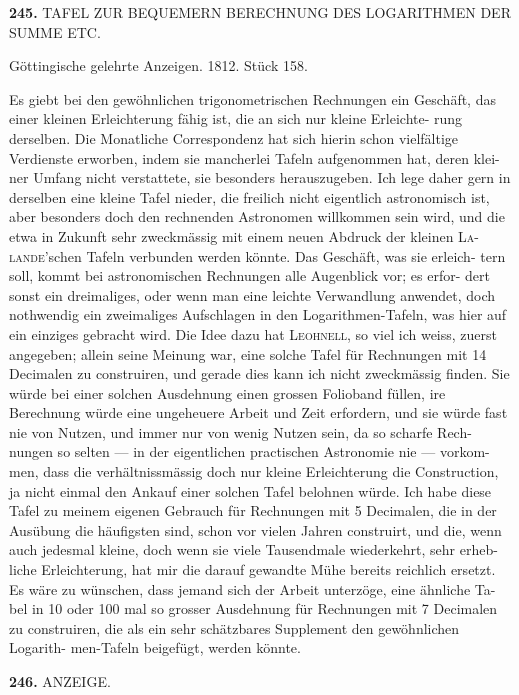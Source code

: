 \documentclass[12pt,a4paper]{article}
\begin{document}
\newpage
\noindent\textbf{245.}\quad
TAFEL ZUR BEQUEMERN BERECHNUNG DES LOGARITHMEN DER SUMME ETC.

\smallskip\noindent
Göttingische gelehrte Anzeigen. 1812. Stück 158.

\smallskip\noindent
Es giebt bei den gewöhnlichen trigonometrischen Rechnungen ein Geschäft,
das einer kleinen Erleichterung fähig ist, die an sich nur kleine Erleichte-
rung derselben. Die Monatliche Correspondenz hat sich hierin schon vielfältige
Verdienste erworben, indem sie mancherlei Tafeln aufgenommen hat, deren klei-
ner Umfang nicht verstattete, sie besonders herauszugeben. Ich lege daher gern
in derselben eine kleine Tafel nieder, die freilich nicht eigentlich astronomisch
ist, aber besonders doch den rechnenden Astronomen willkommen sein wird, und
die etwa in Zukunft sehr zweckmässig mit einem neuen Abdruck der kleinen \textsc{La}-
\textsc{lande}'schen Tafeln verbunden werden könnte. Das Geschäft, was sie erleich-
tern soll, kommt bei astronomischen Rechnungen alle Augenblick vor; es erfor-
dert sonst ein dreimaliges, oder wenn man eine leichte Verwandlung anwendet,
doch nothwendig ein zweimaliges Aufschlagen in den Logarithmen-Tafeln, was
hier auf ein einziges gebracht wird. Die Idee dazu hat \textsc{Leohnell}, so viel ich weiss,
zuerst angegeben; allein seine Meinung war, eine solche Tafel für Rechnungen
mit 14 Decimalen zu construiren, und gerade dies kann ich nicht zweckmässig
finden. Sie würde bei einer solchen Ausdehnung einen grossen Folioband füllen,
ire Berechnung würde eine ungeheuere Arbeit und Zeit erfordern, und sie würde
fast nie von Nutzen, und immer nur von wenig Nutzen sein, da so scharfe Rech-
nungen so selten --- in der eigentlichen practischen Astronomie nie --- vorkom-
men, dass die verhältnissmässig doch nur kleine Erleichterung die Construction,
ja nicht einmal den Ankauf einer solchen Tafel belohnen würde. Ich habe diese
Tafel zu meinem eigenen Gebrauch für Rechnungen mit 5 Decimalen, die in der
Ausübung die häufigsten sind, schon vor vielen Jahren construirt, und die, wenn
auch jedesmal kleine, doch wenn sie viele Tausendmale wiederkehrt, sehr erheb-
liche Erleichterung, hat mir die darauf gewandte Mühe bereits reichlich ersetzt.
Es wäre zu wünschen, dass jemand sich der Arbeit unterzöge, eine ähnliche Ta-
bel in 10 oder 100 mal so grosser Ausdehnung für Rechnungen mit 7 Decimalen zu
construiren, die als ein sehr schätzbares Supplement den gewöhnlichen Logarith-
men-Tafeln beigefügt, werden könnte.

\newpage
\noindent\textbf{246.}\quad
ANZEIGE.
\end{document}
